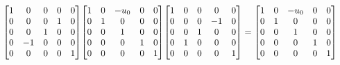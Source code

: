 \documentclass[11pt]{article}
\theoremstyle{definition}
\begin{document}
\[
\scaletoalign{\textwidth}{{\left[\begin{matrix}1 & 0 & 0 & 0 & 0\\0 & 0 & 0 & 1 & 0\\0 & 0 & 1 & 0 & 0\\0 & -1 & 0 & 0 & 0\\0 & 0 & 0 & 0 & 1\end{matrix}\right]} {\left[\begin{matrix}1 & 0 & - u_{0} & 0 & 0\\0 & 1 & 0 & 0 & 0\\0 & 0 & 1 & 0 & 0\\0 & 0 & 0 & 1 & 0\\0 & 0 & 0 & 0 & 1\end{matrix}\right]} {\left[\begin{matrix}1 & 0 & 0 & 0 & 0\\0 & 0 & 0 & -1 & 0\\0 & 0 & 1 & 0 & 0\\0 & 1 & 0 & 0 & 0\\0 & 0 & 0 & 0 & 1\end{matrix}\right]} = {\left[\begin{matrix}1 & 0 & - u_{0} & 0 & 0\\0 & 1 & 0 & 0 & 0\\0 & 0 & 1 & 0 & 0\\0 & 0 & 0 & 1 & 0\\0 & 0 & 0 & 0 & 1\end{matrix}\right]}}
\]
\end{document}
